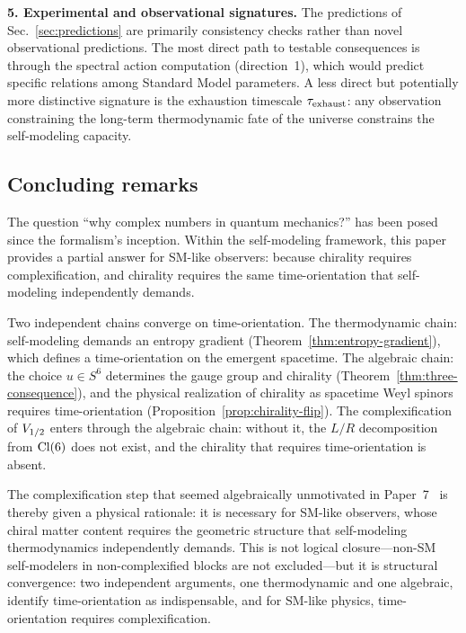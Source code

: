 \medskip\noindent
\textbf{5. Experimental and observational signatures.}
The predictions of Sec.~\ref{sec:predictions} are primarily
consistency checks rather than novel observational predictions.  The
most direct path to testable consequences is through the spectral
action computation (direction~1), which would predict specific
relations among Standard Model parameters.  A less direct but
potentially more distinctive signature is the exhaustion timescale
$\tau_{\mathrm{exhaust}}$: any observation constraining the long-term thermodynamic
fate of the universe constrains the self-modeling capacity.

\subsection{Concluding remarks}\label{sec:concluding}

The question ``why complex numbers in quantum mechanics?'' has
been posed since the formalism's inception.  Within the self-modeling
framework, this paper provides a partial answer for SM-like observers:
because chirality requires complexification, and chirality requires the
same time-orientation that self-modeling independently demands.

Two independent chains converge on time-orientation.  The
thermodynamic chain: self-modeling demands an entropy gradient
(Theorem~\ref{thm:entropy-gradient}), which defines a
time-orientation on the emergent spacetime.  The algebraic chain:
the choice $u \in S^6$ determines the gauge group and chirality
(Theorem~\ref{thm:three-consequence}), and the physical realization
of chirality as spacetime Weyl spinors requires time-orientation
(Proposition~\ref{prop:chirality-flip}).  The complexification of
$V_{1/2}$ enters through the algebraic chain: without it, the $L/R$
decomposition from $\mathrm{Cl}(6)$ does not exist, and the chirality that
requires time-orientation is absent.

The complexification step that seemed algebraically unmotivated in
Paper~7~\cite{Paper7} is thereby given a physical rationale: it is
necessary for SM-like observers, whose chiral matter content requires
the geometric structure that self-modeling thermodynamics independently
demands.  This is not logical closure---non-SM self-modelers in
non-complexified blocks are not excluded---but it is structural
convergence: two independent arguments, one thermodynamic and one
algebraic, identify time-orientation as indispensable, and for
SM-like physics, time-orientation requires complexification.
